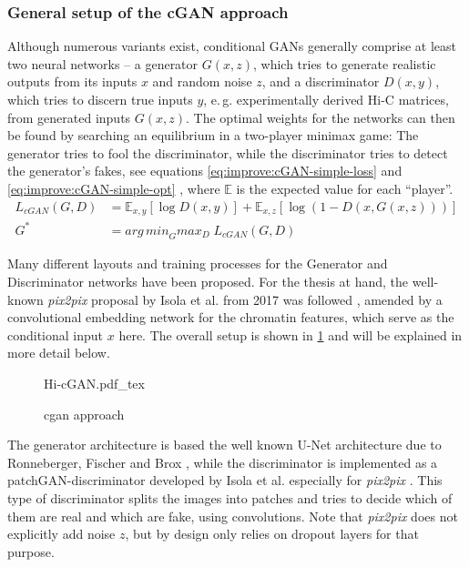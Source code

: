 \subsubsection{General setup of the cGAN approach}
Although numerous variants exist, conditional GANs generally comprise at least two neural networks -- 
a generator $G(x,z)$, which tries to generate realistic outputs from its inputs $x$ and random noise $z$, and a discriminator $D(x,y)$,
which tries to discern true inputs $y$, e.\,g. experimentally derived Hi-C matrices, from generated inputs $G(x,z)$.
The optimal weights for the networks can then be found by searching an equilibrium in a two-player minimax game:
The generator tries to fool the discriminator, while the discriminator tries to detect the generator's fakes, 
see equations \ref{eq:improve:cGAN-simple-loss} and \ref{eq:improve:cGAN-simple-opt} \cite{Isola2017}, where $\mathbb{E}$ is the expected value for each ``player''.
\begin{align}
 L_\mathit{cGAN}(G, D) &= \mathbb{E}_{x,y}[\log D(x,y)] + \mathbb{E}_{x,z}[\log(1-D(x, G(x,z)))] \label{eq:improve:cGAN-simple-loss} \\
 G^* &=  \mathit{arg\,min}_G \mathit{max}_D \; L_\mathit{cGAN}(G, D) \label{eq:improve:cGAN-simple-opt}
\end{align}

Many different layouts and training processes for the Generator and Discriminator networks have been proposed.
For the thesis at hand, the well-known \emph{pix2pix} proposal by Isola et al. from 2017 was followed \cite{Isola2017}, 
amended by a convolutional embedding network for the chromatin features, which serve as the conditional input $x$ here.
The overall setup is shown in \cref{fig:improve:cGAN-approach} and will be explained in more detail below.
\begin{figure}[htbp]
 {Hi-cGAN.pdf_tex}
 \caption{\acrshort{cgan} approach} \label{fig:improve:cGAN-approach}
\end{figure}

The generator architecture is based the well known U-Net architecture due to Ronneberger, Fischer and Brox \cite{Ronneberger2015},
while the discriminator is implemented as a patchGAN-discriminator developed by Isola et al. especially for \emph{pix2pix} \cite{Isola2017}.
This type of discriminator splits the images into patches and tries to decide which of them are real and which are fake, using convolutions.
Note that \emph{pix2pix} does not explicitly add noise $z$, but by design only relies on dropout layers for that purpose. 

